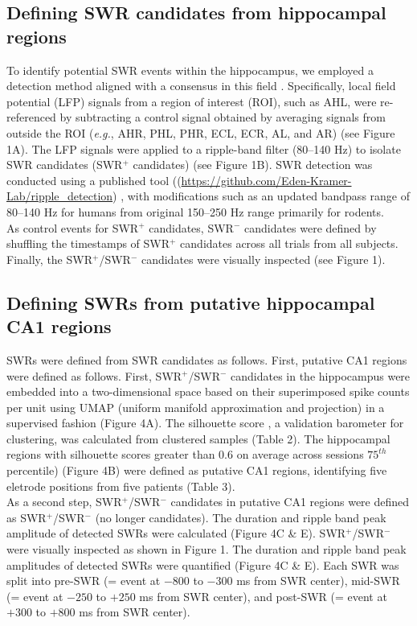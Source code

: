 \subsection{Defining SWR candidates from hippocampal regions}
To identify potential SWR events within the hippocampus, we employed a detection method aligned with a consensus in this field \cite{liu_consensus_2022}. Specifically, local field potential (LFP) signals from a region of interest (ROI), such as AHL, were re-referenced by subtracting a control signal obtained by averaging signals from outside the ROI (\textit{e.g.}, AHR, PHL, PHR, ECL, ECR, AL, and AR) (see Figure 1A). The LFP signals were applied to a ripple-band filter (80--140 Hz) to isolate SWR candidates (SWR$^+$ candidates) (see Figure 1B). SWR detection was conducted using a published tool ((\url{https://github.com/Eden-Kramer-Lab/ripple_detection}) \cite{kay_hippocampal_2016}, with modifications such as an updated bandpass range of 80--140 Hz for humans from original 150--250 Hz range primarily for rodents.
\\
\indent
As control events for SWR$^+$ candidates, SWR$^-$ candidates were defined by shuffling the timestamps of SWR$^+$ candidates across all trials from all subjects. Finally, the SWR$^+$/SWR$^-$ candidates were visually inspected (see Figure 1).

\subsection{Defining SWRs from putative hippocampal CA1 regions}
SWRs were defined from SWR candidates as follows. First, putative CA1 regions were defined as follows. First, SWR$^+$/SWR$^-$ candidates in the hippocampus were embedded into a two-dimensional space based on their superimposed spike counts per unit using UMAP (uniform manifold approximation and projection) \cite{mcinnes_umap_2018} in a supervised fashion (Figure 4A). The silhouette score \cite{rousseeuw_silhouettes_1987}, a validation barometer for clustering, was calculated from clustered samples (Table 2). The hippocampal regions with silhouette scores greater than 0.6 on average across sessions $75^{th}$ percentile) (Figure 4B) were defined as putative CA1 regions, identifying five eletrode positions from five patients (Table 3).
\\
\indent
As a second step, SWR$^+$/SWR$^-$ candidates in putative CA1 regions were defined as SWR$^+$/SWR$^-$ (no longer candidates). The duration and ripple band peak amplitude of detected SWRs were calculated (Figure 4C \& E). SWR$^+$/SWR$^-$ were visually inspected as shown in Figure 1. The duration and ripple band peak amplitudes of detected SWRs were quantified (Figure 4C \& E). Each SWR was split into pre-SWR (= event at $-800$ to $-300$ ms from SWR center), mid-SWR (= event at $-250$ to $+250$ ms from SWR center), and post-SWR (= event at $+300$ to $+800$ ms from SWR center).

